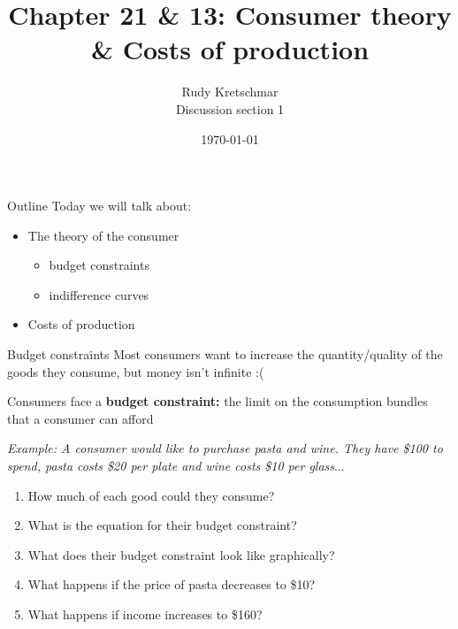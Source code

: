 \documentclass[compress]{beamer}
\title{Chapter 21 \& 13: Consumer theory \& Costs of production}
\author{Rudy Kretschmar \\
    Discussion section 1}
\date{\today}
\begin{document}
\begin{frame}
    \titlepage 
\end{frame}

\begin{frame}{Outline}
    Today we will talk about:
    \begin{itemize}
        \item The theory of the consumer
        \begin{itemize}
            \item budget constraints
            \item indifference curves
        \end{itemize}
        \item Costs of production
    \end{itemize}
\end{frame}

\begin{frame}{Budget constraints}
Most consumers want to increase the quantity/quality of the goods they consume, but money isn't infinite :(

\begin{block}{Consumers face a \textbf{budget constraint:}}
    the limit on the consumption bundles that a consumer can afford
\end{block}
    \vspace{3mm}
\textit{Example: A consumer would like to purchase pasta and wine. They have \$100 to spend, pasta costs \$20 per plate and wine costs \$10 per glass}...
\begin{enumerate}
    \item How much of each good could they consume?
    \item What is the equation for their budget constraint?
    \item What does their budget constraint look like graphically?
    \item What happens if the price of pasta decreases to \$10?
    \item What happens if income increases to \$160?
\end{enumerate}
\end{frame}
\end{document}
